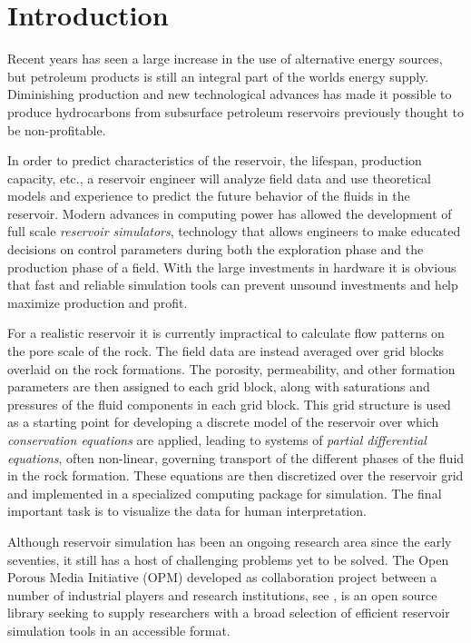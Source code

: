\chapter*{Introduction}
\thispagestyle{chapterpage}
Recent years has seen a large increase in the use of alternative energy sources, but petroleum products is still an integral part of the worlds energy supply. Diminishing production and new technological advances has made it possible to produce hydrocarbons from subsurface petroleum reservoirs previously thought to be non-profitable. 

In order to predict characteristics of the reservoir, the lifespan, production capacity, etc., a reservoir engineer will analyze field data and use theoretical models and experience to predict the future behavior of the fluids in the reservoir. Modern advances in computing power has allowed the development of full scale \emph{reservoir simulators}, technology that allows engineers to make educated decisions on control parameters during both the exploration phase and the production phase of a field. With the large investments in hardware it is obvious that fast and reliable simulation tools can prevent unsound investments and help maximize production and profit. 

For a realistic reservoir it is currently impractical to calculate flow patterns on the pore scale of the rock. The field data are instead averaged over grid blocks overlaid on the rock formations. The porosity, permeability, and other formation parameters are then assigned to each grid block, along with saturations and pressures of the fluid components in each grid block. This grid structure is used as a starting point for developing a discrete model of the reservoir over which \emph{conservation equations} are applied, leading to systems of \emph{partial differential equations}, often non-linear, governing transport of the different phases of the fluid in the rock formation. These equations are then discretized over the reservoir grid and implemented in a specialized computing package for simulation. The final important task is to visualize the data for human interpretation.

Although reservoir simulation has been an ongoing research area since the early seventies, it still has a host of challenging problems yet to be solved. The Open Porous Media Initiative (OPM) developed as collaboration project between a number of industrial players and research institutions, see \cite{opm_2014}, is an open source library seeking to supply researchers with a broad selection of efficient reservoir simulation tools in an accessible format.

